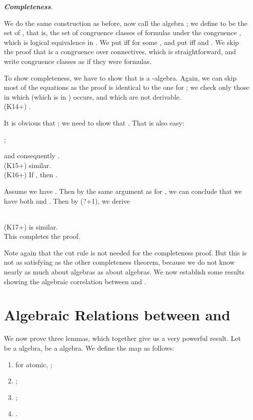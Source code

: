 \documentclass{eptcs}
\newcommand{\proofend}{\hfill }
\begin{document}
\textbf{\textit{Completeness}}.

We do the same construction as before, now call  the
algebra ; we define  to be 
the set of , that is, the set
of congruence classes of  formulas under the congruence
, which is logical equivalence in .
We put  iff 
for some , 
and put  iff  
and .
We skip the proof that  is a congruence
over connectives, which is straightforward, and write 
congruence classes as if they were formulas.

To show completeness, we have to show that 
is a -algebra. 
Again, we can skip  most of the equations as the proof is
identical to the one for ;
we check only those in which  (which is  in )
occurs, and which are not derivable. 
\\

(K14+) . 

It is obvious that ; we need to show that 
. That is also easy:

; 

and consequently
.
\\

(K15+) similar.
\\

(K16+) If , then . 

Assume we have . Then by the same
argument as for , we can conclude that we have both
 and . 
Then by (?+1), we derive


\\

(K17+) is similar.
\\

This completes the proof.
\proofend

Note again that the cut rule is not needed for the completeness proof.
But this is not as satisfying as the other completeness theorem,
because we do not know nearly as much about  algebras
as about  algebras. We now establish some results showing
the algebraic correlation between  and .


\section{Algebraic Relations between  and }

We now prove  three lemmas, which together give us a very 
powerful result. Let  be a  algebra,
 be a  algebra. We define the
map  as follows: 
\begin{enumerate}
\item for  atomic, ;
\item ;
\item ;
\item .
\end{enumerate}
\end{document}
